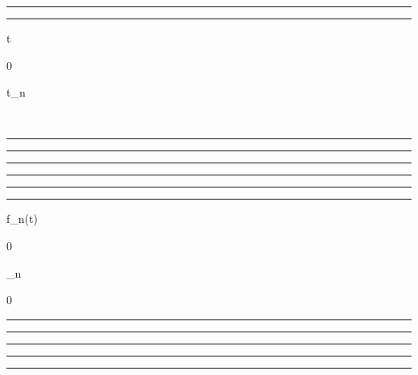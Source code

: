 \documentclass[]{article}
\begin{document}
\begin{center}\rule{3in}{0.4pt}\end{center}

\begin{center}\rule{3in}{0.4pt}\end{center}

t

0

t\_n

\pi~

\begin{center}\rule{3in}{0.4pt}\end{center}

\begin{center}\rule{3in}{0.4pt}\end{center}

\begin{center}\rule{3in}{0.4pt}\end{center}

\begin{center}\rule{3in}{0.4pt}\end{center}

\begin{center}\rule{3in}{0.4pt}\end{center}

\begin{center}\rule{3in}{0.4pt}\end{center}

f\_n(t)

0

\nearrow

\mu\_n

\searrow

0

\begin{center}\rule{3in}{0.4pt}\end{center}

\begin{center}\rule{3in}{0.4pt}\end{center}

\begin{center}\rule{3in}{0.4pt}\end{center}

\begin{center}\rule{3in}{0.4pt}\end{center}

\begin{center}\rule{3in}{0.4pt}\end{center}
\end{document}
